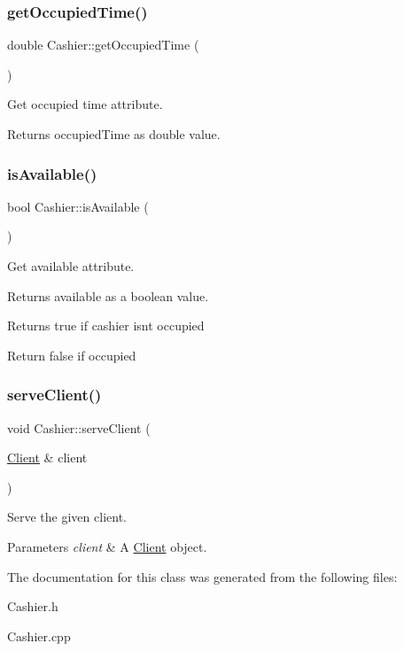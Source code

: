 \subsubsection{\texorpdfstring{get\+Occupied\+Time()}{getOccupiedTime()}}
{\footnotesize\ttfamily double Cashier\+::get\+Occupied\+Time (\begin{DoxyParamCaption}{ }\end{DoxyParamCaption})}

Get occupied time attribute. \begin{DoxyReturn}{Returns}
occupied\+Time as double value. 
\end{DoxyReturn}
\mbox{\label{classCashier_a37d66e1a5f77c8f5cb8d77ef0b43e2e8}} 
\subsubsection{\texorpdfstring{is\+Available()}{isAvailable()}}
{\footnotesize\ttfamily bool Cashier\+::is\+Available (\begin{DoxyParamCaption}{ }\end{DoxyParamCaption})}

Get available attribute. \begin{DoxyReturn}{Returns}
available as a boolean value.
\begin{DoxyItemize}
\item Returns true if cashier isn\textquotesingle{}t occupied
\item Return false if occupied 
\end{DoxyItemize}
\end{DoxyReturn}
\mbox{\label{classCashier_a98be1361808932fb8a2fa4c294dcf09a}} 
\subsubsection{\texorpdfstring{serve\+Client()}{serveClient()}}
{\footnotesize\ttfamily void Cashier\+::serve\+Client (\begin{DoxyParamCaption}\item[{\hyperlink{classClient}{Client} \&}]{client }\end{DoxyParamCaption})}

Serve the given client. 
\begin{DoxyParams}{Parameters}
{\em client} & A \hyperlink{classClient}{Client} object. \\
\hline
\end{DoxyParams}


The documentation for this class was generated from the following files\+:\begin{DoxyCompactItemize}
\item 
Cashier.\+h\item 
Cashier.\+cpp\end{DoxyCompactItemize}
